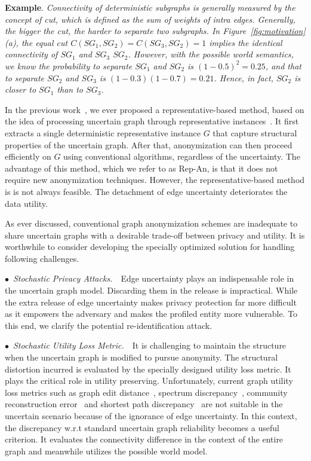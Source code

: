 \textbf{Example}. \emph{Connectivity of deterministic subgraphs is generally measured by the concept of cut, which is defined as the sum of weights of intra edges. Generally, the bigger the cut, the harder to separate two subgraphs. In Figure~\ref{fig:motivation}(a), the equal cut $C(SG_{1},SG_{2})=C(SG_{3},SG_{2})=1$ implies the identical connectivity of $SG_{1}$ and $SG_{3}$ {\wrt} $SG_{2}$. However, with the possible world semantics, we know the probability to separate $SG_{1}$ and $SG_{2}$ is $(1-0.5)^{2}=0.25$, and that to separate $SG_{2}$ and $SG_{3}$ is $(1-0.3)(1-0.7)=0.21$. Hence, in fact, $SG_{2}$ is closer to $SG_{1}$ than to $SG_{3}$. }

In the previous work~\cite{Xiao:2018}, we ever proposed a representative-based method, based on the idea of processing uncertain graph through representative instances~\cite{Parchas_Gullo_Papadias_Bonchi_2014}.
It first extracts a single deterministic representative instance $G$ that capture structural properties of the uncertain graph.
After that, anonymization can then proceed efficiently on $G$ using conventional algorithms, regardless of the uncertainty.  
The advantage of this method, which we refer to as Rep-An, is that it does not require new anonymization techniques. 
However, the representative-based method is is not always feasible. 
The detachment of edge uncertainty deteriorates the data utility. 

As ever discussed, conventional graph anonymization schemes are inadequate to share uncertain graphs with a desirable trade-off between privacy and utility. 
It is worthwhile to consider developing the specially optimized solution for handling following challenges. 

$\bullet$~\textup{\emph{Stochastic Privacy Attacks.}}~~Edge uncertainty plays an indispensable role in the uncertain graph model. Discarding them in the release is impractical.  
While the extra release of edge uncertainty makes privacy protection far more difficult as it empowers the adversary and makes the profiled entity more vulnerable. 
To this end, we clarify the potential re-identification attack. 

$\bullet$~\textup{\emph{Stochastic Utility Loss Metric.}}~~It is challenging to maintain the structure when the uncertain graph is modified to pursue anonymity. 
The structural distortion incurred is evaluated by the specially designed utility loss metric.  
It plays the critical role in utility preserving. 
Unfortunately, current graph utility loss metrics such as graph edit distance~\cite{Liu_Towards_2008}, spectrum discrepancy~\cite{Ying_Randomizing_2008}, community reconstruction error~\cite{Wang2011} and shortest path discrepancy~\cite{Liu_Privacy_2009} 
are not suitable in the uncertain scenario because of the ignorance of edge uncertainty.
In this context, the discrepancy w.r.t standard uncertain graph reliability becomes a useful criterion. It evaluates the connectivity difference in the context of the entire graph and meanwhile utilizes the possible world model. 

